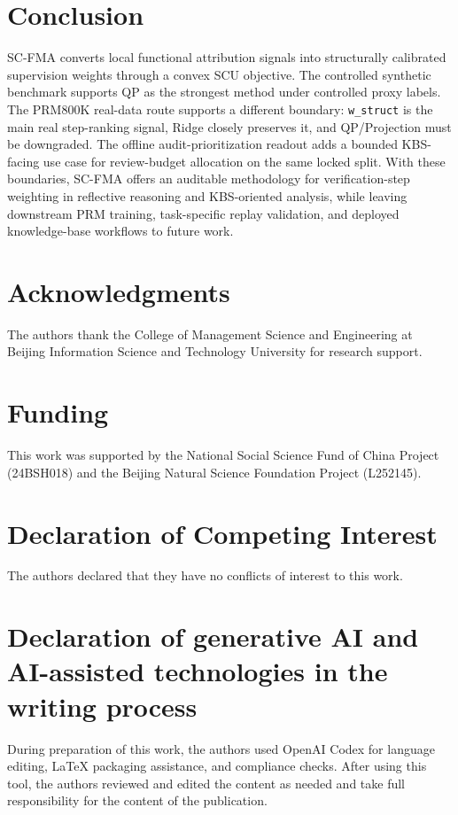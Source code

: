 \documentclass[a4paper,fleqn]{cas-sc}
\begin{document}
\section{Conclusion}

SC-FMA converts local functional attribution signals into structurally calibrated supervision weights through a convex SCU objective. The controlled synthetic benchmark supports QP as the strongest method under controlled proxy labels. The PRM800K real-data route supports a different boundary: \texttt{w\_struct} is the main real step-ranking signal, Ridge closely preserves it, and QP/Projection must be downgraded. The offline audit-prioritization readout adds a bounded KBS-facing use case for review-budget allocation on the same locked split. With these boundaries, SC-FMA offers an auditable methodology for verification-step weighting in reflective reasoning and KBS-oriented analysis, while leaving downstream PRM training, task-specific replay validation, and deployed knowledge-base workflows to future work.

\section*{Acknowledgments}
The authors thank the College of Management Science and Engineering at Beijing Information Science and Technology University for research support.

\section*{Funding}
This work was supported by the National Social Science Fund of China Project (24BSH018) and the Beijing Natural Science Foundation Project (L252145).

\section*{Declaration of Competing Interest}
The authors declared that they have no conflicts of interest to this work.

\section*{Declaration of generative AI and AI-assisted technologies in the writing process}
During preparation of this work, the authors used OpenAI Codex for language editing, LaTeX packaging assistance, and compliance checks. After using this tool, the authors reviewed and edited the content as needed and take full responsibility for the content of the publication.
\end{document}
